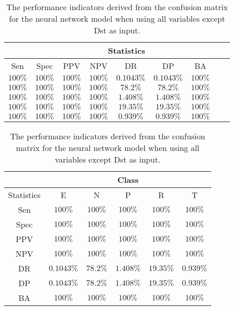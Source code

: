 \begin{table}[!ht]
	\centering
	\begin{tabular}{|c|c|c|c|c|c|c|c|c|}
		\hline
		 & \multicolumn{7}{c|}{Statistics} \\ \hline
		Sen & Spec & PPV & NPV & DR & DP & BA \\ \hline
		$100\%$ & $100\%$ & $100\%$ & $100\%$ & $0.1043\%$ & $0.1043\%$ & $100\%$ \\ \hline
		$100\%$ & $100\%$ & $100\%$ & $100\%$ & $78.2\%$ & $78.2\%$ & $100\%$ \\ \hline
		$100\%$ & $100\%$ & $100\%$ & $100\%$ & $1.408\%$ & $1.408\%$ & $100\%$ \\ \hline
		$100\%$ & $100\%$ & $100\%$ & $100\%$ & $19.35\%$ & $19.35\%$ & $100\%$ \\ \hline
		$100\%$ & $100\%$ & $100\%$ & $100\%$ & $0.939\%$ & $0.939\%$ & $100\%$ \\ \hline
	\end{tabular}
	\caption{The performance indicators derived from the confusion matrix for the neural network model when using all variables except Dst as input.}
	\label{tab:cs:noDst:nnet}
\end{table}

\begin{table}[!ht]
	\centering
	\begin{tabular}{|c|c|c|c|c|c|}
		\hline
		 & \multicolumn{5}{c|}{Class} \\ \hline
		Statistics & E & N & P & R & T \\ \hline
		Sen & $100\%$ & $100\%$ & $100\%$ & $100\%$ & $100\%$ \\ \hline
		Spec & $100\%$ & $100\%$ & $100\%$ & $100\%$ & $100\%$ \\ \hline
		PPV & $100\%$ & $100\%$ & $100\%$ & $100\%$ & $100\%$ \\ \hline
		NPV & $100\%$ & $100\%$ & $100\%$ & $100\%$ & $100\%$ \\ \hline
		DR & $0.1043\%$ & $78.2\%$ & $1.408\%$ & $19.35\%$ & $0.939\%$ \\ \hline
		DP & $0.1043\%$ & $78.2\%$ & $1.408\%$ & $19.35\%$ & $0.939\%$ \\ \hline
		BA & $100\%$ & $100\%$ & $100\%$ & $100\%$ & $100\%$ \\ \hline
	\end{tabular}
	\caption{The performance indicators derived from the confusion matrix for the neural network model when using all variables except Dst as input.}
	\label{tab:cs:reverse:noDst:nnet}
\end{table}

